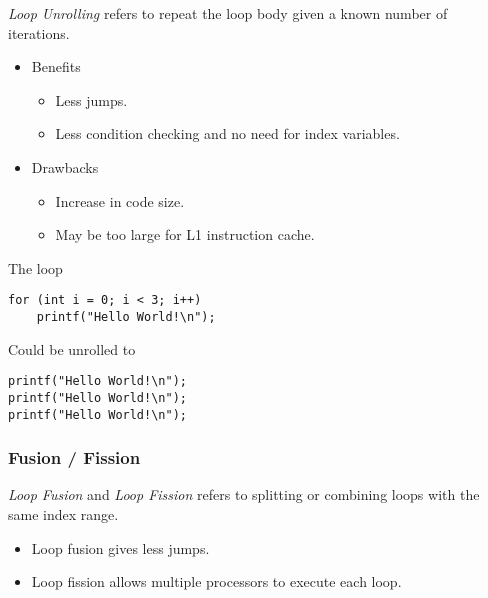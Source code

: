 \begin{definition}
    \textit{Loop Unrolling} refers to repeat the loop body given a known number of iterations.
    
    \begin{itemize}
        \item Benefits
        \begin{itemize}
            \item Less jumps.
            \item Less condition checking and no need for index variables.
        \end{itemize}
        \item Drawbacks
        \begin{itemize}
            \item Increase in code size.
            \item May be too large for L1 instruction cache.
        \end{itemize}
    \end{itemize}
\end{definition}

\begin{example}
    The loop
    \begin{verbatim}
for (int i = 0; i < 3; i++)
    printf("Hello World!\n");
    \end{verbatim}
    
    Could be unrolled to
    \begin{verbatim}
printf("Hello World!\n");
printf("Hello World!\n");
printf("Hello World!\n");
    \end{verbatim}
\end{example}

\subsubsection{Fusion / Fission}

\begin{definition}
    \textit{Loop Fusion} and \textit{Loop Fission} refers to splitting or combining loops with the same index range.
    
    \begin{itemize}
        \item Loop fusion gives less jumps.
        \item Loop fission allows multiple processors to execute each loop.
    \end{itemize}
\end{definition}

